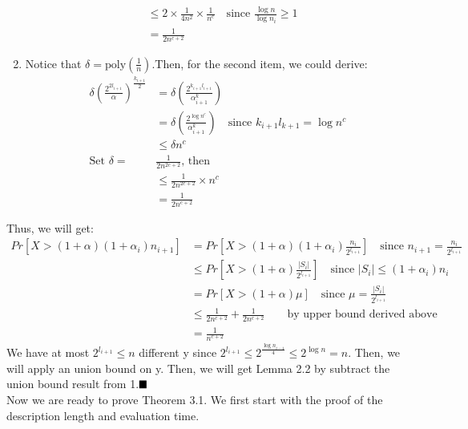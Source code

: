 \documentclass[a4paper, english]{paper}
\begin{document}
\begin{enumerate}
\begin{align*}
		& \le 2\times\frac1{4n^2}\times\frac1{n^c}\quad\text{since } \frac{\log n}{\log n_i} \ge 1\\
		& = \frac1{2n^{c+2}}
		\end{align*}
	\item Notice that $\delta=\text{poly}(\frac1n)$.Then, for the second item, we could derive:
		\begin{align*}
		\delta\left( \frac{2^{2l_{i+1}}}{\alpha}\right)^{\frac{k_{i+1}}2} &= \delta\left( \frac{2^{k_{i+1}l_{i+1}}}{\alpha^k_{i+1}}\right)\\
		& =  \delta\left( \frac{2^{\log n^c}}{\alpha^k_{i+1}}\right)\quad\text{since }k_{i+1}l_{k+1} = \log n^c\\
		& \le \delta n^c\\
		\text{Set }\delta = &\frac1{2n^{2c+2}}\text{, then}\\
		& \le \frac1{2n^{2c+2}}\times n^c\\
		& = \frac1{2n^{c+2}}
		\end{align*}
	\end{enumerate}
	Thus, we will get:
	\begin{align*}
	Pr\left[X>(1+\alpha)(1+\alpha_i)n_{i+1}\right] &= Pr\left[X>(1+\alpha)(1+\alpha_i)\frac{n_i}{2^{l_{i+1}}}\right]\quad\text{since }n_{i+1} = \frac{n_i}{2^{l_{i+1}}}\\
	& \le Pr\left[X>(1+\alpha)\frac{|S_i|}{2^{l_{i+1}}}\right]\quad\text{since }|S_i|\le(1+\alpha_i)n_i\\
	& = Pr \left[X>(1+\alpha)\mu\right]\quad\text{since }\mu = \frac{|S_i|}{2^{l_{i+1}}}\\
	& \le \frac1{2n^{c+2}}+\frac1{2n^{c+2}}\qquad \text{by upper bound derived above}\\ 
	& = \frac1{n^{c+2}}
	\end{align*}
	We have at most $2^{l_{i+1}}\le n$ different y since $2^{l_{i+1}}\le2^{\frac{\log n_{i-1}}4}\le 2^{\log n}=n$. Then, we will apply an union bound on y. Then, we will get Lemma 2.2 by subtract the union bound result from 1.$\hfill\blacksquare$ \\

	\noindent Now we are ready to prove Theorem 3.1. We first start with the proof of the description length and evaluation time.\\
	
\end{document}
